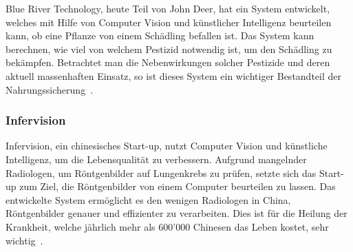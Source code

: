 
Blue River Technology, heute Teil von John Deer, hat ein System entwickelt, welches mit Hilfe von Computer Vision und künstlicher Intelligenz beurteilen kann, ob eine Pflanze von einem Schädling befallen ist. Das System kann berechnen, wie viel von welchem Pestizid notwendig ist, um den Schädling zu bekämpfen. Betrachtet man die Nebenwirkungen solcher Pestizide und deren aktuell massenhaften Einsatz, so ist dieses System ein wichtiger Bestandteil der Nahrungssicherung~\autocite{BlueRiverTechnology}.

\subsubsection{Infervision}

Infervision, ein chinesisches Start-up, nutzt Computer Vision und künstliche Intelligenz, um die Lebensqualität zu verbessern. Aufgrund mangelnder Radiologen, um Röntgenbilder auf Lungenkrebs zu prüfen, setzte sich das Start-up zum Ziel, die Röntgenbilder von einem Computer beurteilen zu lassen. Das entwickelte System ermöglicht es den wenigen Radiologen in China, Röntgenbilder genauer und effizienter zu verarbeiten. Dies ist für die Heilung der Krankheit, welche jährlich mehr als 600'000 Chinesen das Leben kostet, sehr wichtig~\autocite{Infervision}.











